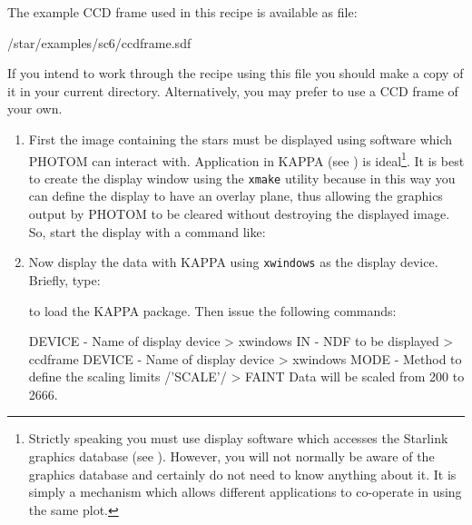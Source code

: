 \documentclass[twoside,11pt,nolof]{starlink}
\begin{document}
The example CCD frame used in this recipe is available as file:

\begin{terminalv}
/star/examples/sc6/ccdframe.sdf
\end{terminalv}

If you intend to work through the recipe using this file you should make
a copy of it in your current directory.  Alternatively, you may prefer
to use a CCD frame of your own.

\begin{enumerate}

  \item First the image containing the stars must be displayed using
   software which PHOTOM can interact with.  Application
   in KAPPA (see \cite{SUN95}) is
   ideal\footnote{Strictly speaking you must use display software
   which accesses the Starlink graphics database (see
   \cite{SUN48}).  However, you will not normally
   be aware of the graphics database and certainly do not need to know
   anything about it.  It is simply a mechanism which allows different
   applications to co-operate in using the same plot.}.  It is best to
   create the display window using the \texttt{xmake} utility because in this
   way you can define the display to have an overlay plane, thus allowing
   the graphics output by PHOTOM to be cleared without destroying the
   displayed image. So, start the display with a command like:

\begin{terminalv}
\end{terminalv}

  \item Now display the data with KAPPA
    using \texttt{xwindows} as the
   display device.  Briefly, type:

\begin{terminalv}
\end{terminalv}

   to load the KAPPA package.  Then issue the following commands:

\begin{terminalv}
DEVICE - Name of display device > xwindows
IN - NDF to be displayed > ccdframe
DEVICE - Name of display device > xwindows
MODE - Method to define the scaling limits /'SCALE'/ > FAINT
Data will be scaled from 200 to 2666.
\end{terminalv}


\end{enumerate}
\end{document}
